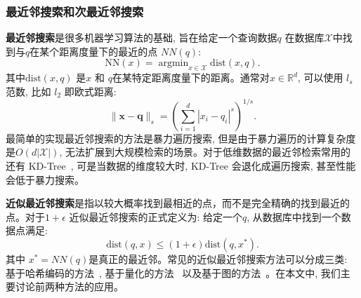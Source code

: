 \subsubsection{最近邻搜索和次最近邻搜索}
\textbf{最近邻搜索}是很多机器学习算法的基础, 旨在给定一个查询数据$q$ 在数据库$\mathcal{X}$中找到与$q$在某个距离度量下的最近的点 $NN(q)$:
\begin{equation}
    \mathrm{NN}(x)=\operatorname{argmin}_{x \in \mathcal{X}} \text{dist}(x, q).
\end{equation}
其中$\text{dist}(x, q)$ 是$x$ 和 $q$在某特定距离度量下的距离。通常对$x \in \mathbb{R}^d$, 可以使用 $l_s$ 范数, 比如 $l_2$ 即欧式距离:
\begin{equation}
    \|\mathbf{x}-\mathbf{q}\|_s=\left(\sum_{i=1}^d\left|x_i-q_i\right|^s\right)^{1 / s}.
\end{equation}
最简单的实现最近邻搜索的方法是暴力遍历搜索, 但是由于暴力遍历的计算复杂度是$O(d|\mathcal{X}|)$, 无法扩展到大规模检索的场景。对于低维数据的最近邻检索常用的还有 KD-Tree~\cite{friedman1977algorithm}, 可是当数据的维度较大时, KD-Tree 会退化成遍历搜索, 甚至性能会低于暴力搜索。 \par
\textbf{近似最近邻搜索}是指以较大概率找到最相近的点，而不是完全精确的找到最近的点。对于$1 + \epsilon$ 近似最近邻搜索的正式定义为: 给定一个$q$, 从数据库中找到一个数据点满足:
\begin{equation}
    \text{dist}(q, x) \leq (1 + \epsilon)\text{dist}(q, x^*). 
\end{equation}
其中 $x^* = NN(q)$是真正的最近邻。常见的近似最近邻搜索方法可以分成三类: 基于哈希编码的方法~\cite{weiss2008spectral,weiss2012multidimensional,xu2013harmonious, salakhutdinov2009semantic, indyk1998approximate}, 基于量化的方法~\cite{jegou2010product, kalantidis2014locally, chen2010approximate, ge2013optimized} 以及基于图的方法~\cite{hajebi2011fast, malkov2014approximate, malkov2018efficient}。在本文中, 我们主要讨论前两种方法的应用。
